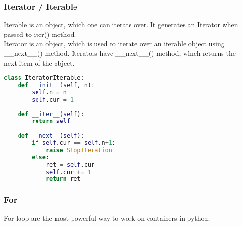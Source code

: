 \documentclass[a4paper, 12pt, titlepage]{scrartcl} %
\begin{document}
\subsubsection{Iterator / Iterable}
Iterable is an object, which one can iterate over. It generates an Iterator when passed to iter() method. \\
Iterator is an object, which is used to iterate over an iterable object using \_\_next\_\_() method. Iterators have \_\_next\_\_() method, which returns the next item of the object.
\begin{lstlisting}[language=Python]
class IteratorIterable:
    def __init__(self, n):
        self.n = n
        self.cur = 1
        
    def __iter__(self):
        return self
        
    def __next__(self):
        if self.cur == self.n+1:
            raise StopIteration
        else:
            ret = self.cur
            self.cur += 1 
            return ret
\end{lstlisting}

\subsubsection{For}
\label{subsec:For}
For loop are the most powerful way to work on containers in python.
\end{document}
